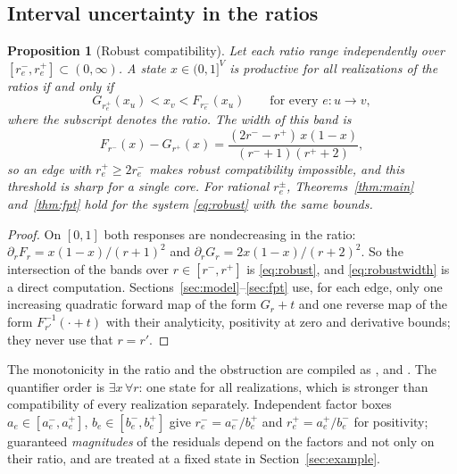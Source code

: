 \documentclass[11pt,a4paper]{article}
\theoremstyle{plain}
\newtheorem{proposition}[theorem]{Proposition}
\theoremstyle{definition}
\theoremstyle{remark}
\begin{document}
\subsection{Interval uncertainty in the ratios}
\begin{proposition}[Robust compatibility]\label{prop:robust}
Let each ratio range independently over $[r_e^-,r_e^+]\subset(0,\infty)$. A state $x\in(0,1]^V$ is productive for \emph{all} realizations of the ratios if and only if
\begin{equation}\label{eq:robust}
   G_{r_e^+}(x_u)<x_v<F_{r_e^-}(x_u)\qquad\text{for every } e\colon u\to v,
\end{equation}
where the subscript denotes the ratio. The width of this band is
\begin{equation}\label{eq:robustwidth}
   F_{r^-}(x)-G_{r^+}(x)=\frac{(2r^--r^+)\,x(1-x)}{(r^-+1)(r^++2)} ,
\end{equation}
so an edge with $r_e^+\ge2r_e^-$ makes robust compatibility impossible, and this threshold is sharp for a single core. For rational $r_e^\pm$, Theorems~\ref{thm:main} and~\ref{thm:fpt} hold for the system \eqref{eq:robust} with the same bounds.
\end{proposition}
\begin{proof}
On $[0,1]$ both responses are nondecreasing in the ratio: $\partial_rF_r=x(1-x)/(r+1)^2$ and $\partial_rG_r=2x(1-x)/(r+2)^2$. So the intersection of the bands over $r\in[r^-,r^+]$ is \eqref{eq:robust}, and \eqref{eq:robustwidth} is a direct computation. Sections~\ref{sec:model}--\ref{sec:fpt} use, for each edge, only one increasing quadratic forward map of the form $G_r+t$ and one reverse map of the form $F_{r'}^{-1}(\cdot+t)$ with their analyticity, positivity at zero and derivative bounds; they never use that $r=r'$.
\end{proof}

The monotonicity in the ratio and the obstruction are compiled as ,  and . The quantifier order is $\exists x\,\forall r$: one state for all realizations, which is stronger than compatibility of every realization separately. Independent factor boxes $a_e\in[a_e^-,a_e^+]$, $b_e\in[b_e^-,b_e^+]$ give $r_e^-=a_e^-/b_e^+$ and $r_e^+=a_e^+/b_e^-$ for positivity; guaranteed \emph{magnitudes} of the residuals depend on the factors and not only on their ratio, and are treated at a fixed state in Section~\ref{sec:example}.
\end{document}
